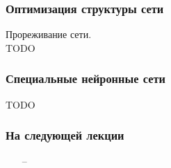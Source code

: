 \documentclass[12pt]{beamer}
\begin{document}
\begin{frame}\frametitle{Оптимизация структуры сети}
Прореживание сети.\\
TODO
\end{frame}


\begin{frame}\frametitle{Специальные нейронные сети}
TODO

\end{frame}

\begin{frame}\frametitle{На следующей лекции}
\begin{itemize}
\item[--] 
\end{itemize}
\end{frame}
\end{document}
